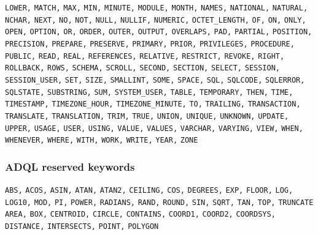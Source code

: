\documentclass[11pt,a4paper]{ivoa}
\begin{document}
\texttt{LOWER,} \texttt{MATCH,} \texttt{MAX,} \texttt{MIN,} 
\texttt{MINUTE,} \texttt{MODULE,} \texttt{MONTH,} \texttt{NAMES,} 
\texttt{NATIONAL,} \texttt{NATURAL,} \texttt{NCHAR,} \texttt{NEXT,} 
\texttt{NO,} \texttt{NOT,} \texttt{NULL,} \texttt{NULLIF,} 
\texttt{NUMERIC,} \texttt{OCTET\_LENGTH,} \texttt{OF,} \texttt{ON,} 
\texttt{ONLY,} \texttt{OPEN,} \texttt{OPTION,} \texttt{OR,} 
\texttt{ORDER,} \texttt{OUTER,} \texttt{OUTPUT,} \texttt{OVERLAPS,} 
\texttt{PAD,} \texttt{PARTIAL,} \texttt{POSITION,} 
\texttt{PRECISION,} \texttt{PREPARE,} \texttt{PRESERVE,} 
\texttt{PRIMARY,} \texttt{PRIOR,} \texttt{PRIVILEGES,} 
\texttt{PROCEDURE,} \texttt{PUBLIC,} \texttt{READ,} \texttt{REAL,} 
\texttt{REFERENCES,} \texttt{RELATIVE,} \texttt{RESTRICT,} 
\texttt{REVOKE,} \texttt{RIGHT,} \texttt{ROLLBACK,} \texttt{ROWS,} 
\texttt{SCHEMA,} \texttt{SCROLL,} \texttt{SECOND,} \texttt{SECTION,} 
\texttt{SELECT,} \texttt{SESSION,} \texttt{SESSION\_USER,} 
\texttt{SET,} \texttt{SIZE,} \texttt{SMALLINT,} \texttt{SOME,} 
\texttt{SPACE,} \texttt{SQL,} \texttt{SQLCODE,} \texttt{SQLERROR,} 
\texttt{SQLSTATE,} \texttt{SUBSTRING,} \texttt{SUM,} 
\texttt{SYSTEM\_USER,} \texttt{TABLE,} \texttt{TEMPORARY,} 
\texttt{THEN,} \texttt{TIME,} \texttt{TIMESTAMP,} 
\texttt{TIMEZONE\_HOUR,} \texttt{TIMEZONE\_MINUTE,} \texttt{TO,} 
\texttt{TRAILING,} \texttt{TRANSACTION,} \texttt{TRANSLATE,} 
\texttt{TRANSLATION,} \texttt{TRIM,} \texttt{TRUE,} \texttt{UNION,} 
\texttt{UNIQUE,} \texttt{UNKNOWN,} \texttt{UPDATE,} \texttt{UPPER,} 
\texttt{USAGE,} \texttt{USER,} \texttt{USING,} \texttt{VALUE,} 
\texttt{VALUES,} \texttt{VARCHAR,} \texttt{VARYING,} \texttt{VIEW,} 
\texttt{WHEN,} \texttt{WHENEVER,} \texttt{WHERE,} \texttt{WITH,} 
\texttt{WORK,} \texttt{WRITE,} \texttt{YEAR,} \texttt{ZONE} 

\subsubsection{ADQL reserved keywords}
\label{sec:adql.reswords}

\noindent
\texttt{ABS,} \texttt{ACOS,} \texttt{ASIN,} \texttt{ATAN,} 
\texttt{ATAN2,} \texttt{CEILING,} \texttt{COS,} \texttt{DEGREES,} 
\texttt{EXP,} \texttt{FLOOR,} \texttt{LOG,} \texttt{LOG10,} 
\texttt{MOD,} \texttt{PI,} \texttt{POWER,} \texttt{RADIANS,} 
\texttt{RAND,} \texttt{ROUND,} \texttt{SIN,} \texttt{SQRT,} 
\texttt{TAN,} \texttt{TOP,} \texttt{TRUNCATE}
\newline
\newline
\noindent
\texttt{AREA,} \texttt{BOX,} \texttt{CENTROID,} \texttt{CIRCLE,} 
\texttt{CONTAINS,} \texttt{COORD1,} \texttt{COORD2,} 
\texttt{COORDSYS,} \texttt{DISTANCE,} \texttt{INTERSECTS,} 
\texttt{POINT,} \texttt{POLYGON}
\end{document}
